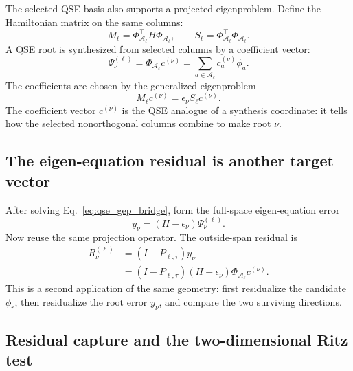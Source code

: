 \documentclass[10pt,twocolumn]{article}
\begin{document}
The selected QSE basis also supports a projected eigenproblem. Define the Hamiltonian matrix on the same columns:
\begin{equation}
M_\ell=\Phi_{\mathcal A_\ell}^{\top}H\Phi_{\mathcal A_\ell},
\qquad
S_\ell=\Phi_{\mathcal A_\ell}^{\top}\Phi_{\mathcal A_\ell}.
\label{eq:qse_MS_bridge}
\end{equation}
A QSE root is synthesized from selected columns by a coefficient vector:
\begin{equation}
\Psi_\nu^{(\ell)}
=\Phi_{\mathcal A_\ell}c^{(\nu)}
=\sum_{a\in\mathcal A_\ell}c_a^{(\nu)}\phi_a.
\label{eq:qse_root_coefficients_bridge}
\end{equation}
The coefficients are chosen by the generalized eigenproblem
\begin{equation}
\boxed{M_\ell c^{(\nu)}=\epsilon_\nu S_\ell c^{(\nu)}.}
\label{eq:qse_gep_bridge}
\end{equation}
The coefficient vector \(c^{(\nu)}\) is the QSE analogue of a synthesis coordinate: it tells how the selected nonorthogonal columns combine to make root \(\nu\).

\subsection{The eigen-equation residual is another target vector}

After solving Eq.~\eqref{eq:qse_gep_bridge}, form the full-space eigen-equation error
\begin{equation}
y_\nu=(H-\epsilon_\nu)\Psi_\nu^{(\ell)}.
\label{eq:qse_y_residual_target}
\end{equation}
Now reuse the same projection operator. The outside-span residual is
\begin{equation}
\begin{aligned}
R_\nu^{(\ell)}
&=(I-P_{\ell,\tau})y_\nu\\
&=(I-P_{\ell,\tau})(H-\epsilon_\nu)\Phi_{\mathcal A_\ell}c^{(\nu)}.
\end{aligned}
\label{eq:qse_outside_residual_bridge}
\end{equation}
This is a second application of the same geometry: first residualize the candidate \(\phi_r\), then residualize the root error \(y_\nu\), and compare the two surviving directions.

\subsection{Residual capture and the two-dimensional Ritz test}
\end{document}
